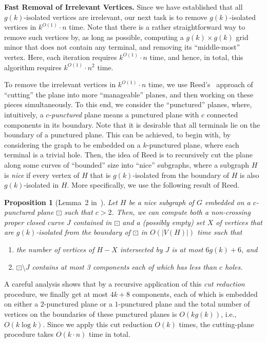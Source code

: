 \documentclass{article}
\newtheorem{proposition}[theorem]{Proposition}
\numberwithin{claimcounter}{lemma}
\begin{document}
\medskip
\noindent\textbf{Fast Removal of Irrelevant Vertices.} Since we have established that all $g(k)$-isolated vertices are irrelevant, our next task is to remove $g(k)$-isolated vertices in $k^{O(1)}\cdot n$ time.  Note that there is a rather straightforward way to remove such vertices by, as long as possible, computing a $g(k)\times g(k)$ grid minor that does not contain any terminal, and removing its ``middle-most'' vertex. Here, each iteration requires $k^{O(1)}\cdot n$ time, and hence, in total, this algorithm requires $k^{O(1)}\cdot n^2$ time. 

To remove the irrelevant vertices in $k^{O(1)}\cdot n$ time, we use Reed's~\cite{reedLinear} approach of ``cutting'' the plane into more ``manageable'' planes, and then working on these pieces simultaneously. To this end, we consider the ``punctured'' planes, where, intuitively, a $c$-\textit{punctured} plane means a punctured plane with $c$ connected components in its boundary. Note that it is desirable that all terminals lie on the boundary of a punctured plane. This can be achieved, to begin with, by considering the graph to be embedded on a $k$-punctured plane, where each terminal is a trivial hole. Then, the idea of Reed is to recursively cut the plane along some curves of ``bounded'' size into ``nice'' subgraphs, where a subgraph $H$ is \textit{nice} if every vertex of $H$ that is $g(k)$-isolated from the boundary of $H$ is also $g(k)$-isolated in $H$. More specifically, we use the following result of Reed.
\begin{proposition}[Lemma~2 in~\cite{reedLinear}]
    Let $H$ be a nice subgraph of $G$ embedded on a $c$-punctured plane $\boxdot$ such that $c>2$. Then, we can compute both a non-crossing proper closed curve $J$ contained in $
    \boxdot$ and a (possibly empty) set $X$ of vertices that are $g(k)$-isolated from the boundary of $\boxdot$ in $O(|V(H)|)$ time such that 
    \begin{enumerate}
        \item the number of vertices of $H-X$ intersected by $J$ is at most $6g(k)+6$, and
        \item $\boxdot\setminus J$ contains at most 3 components each of which has less than $c$ holes.
    \end{enumerate}
\end{proposition}

A careful analysis shows that by a recursive application of this \textit{cut reduction} procedure, we finally get at most $4k+8$ components, each of which is embedded on either a $2$-punctured plane or a $1$-punctured plane and the total number of vertices on the boundaries of these punctured planes is ${O(k g(k))}$, i.e., $O(k \log k)$. Since we apply this cut reduction  $O(k)$ times, the cutting-plane procedure takes $O(k\cdot n)$ time in total.
\end{document}
